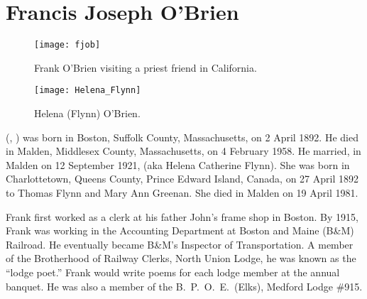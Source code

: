 \section{Francis Joseph O'Brien}\label{per:Francis4OBrien}

\begin{figure}[htbp]
	\centering
	\texttt{[image: fjob]}
	\caption{Frank O'Brien visiting a priest friend in California.}
	\label{fig:FJOB}
\end{figure}

\begin{figure}[htbp]
	\centering
	\texttt{[image: Helena\_Flynn]}
	\caption{Helena (Flynn) O'Brien.}
	\label{fig:HelenaFlynn}
\end{figure}

 (, ) was born in Boston, Suffolk County, Massachusetts, on 2 April 1892.\cite{Francis4OBrienBirth} He died in Malden, Middlesex County, Massachusetts, on 4 February 1958.\cite{Francis4OBrienDeath} He married, in Malden on 12 September 1921,  (aka Helena Catherine Flynn).\cite{Francis4OBrienMarriageCert} She was born in Charlottetown, Queens County, Prince Edward Island, Canada, on 27 April 1892 to Thomas Flynn and Mary Ann Greenan.\cite{MaryFlynnBirth} She died in Malden on 19 April 1981.\cite{MaryFlynnDeath}

Frank first worked as a clerk at his father John's frame shop in Boston.\cite{Census1910Francis4OBrien} By 1915, Frank was working in the Accounting Department at Boston and Maine (B\&M) Railroad.\cite{Francis4OBrienAccounting} He eventually became B\&M's Inspector of Transportation.\cite{Francis4OBrienInspector} A member of the Brotherhood of Railway Clerks, North Union Lodge, he was known as the ``lodge poet.'' Frank would write poems for each lodge member at the annual banquet.\cite{Francis4OBrienPoet} He was also a member of the B.\ P.\ O.\ E.\ (Elks), Medford Lodge \#915.\cite{Francis4OBrienBPOE}

